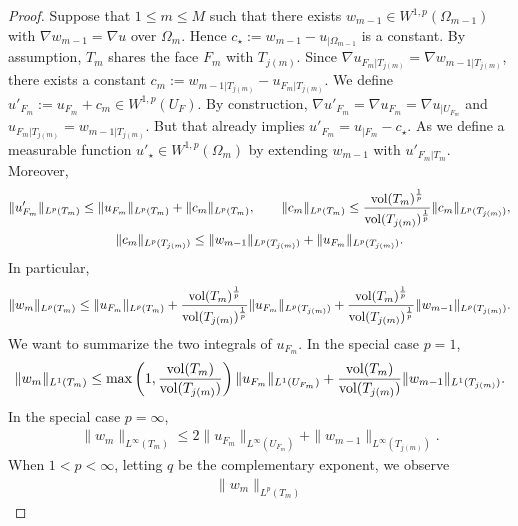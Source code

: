 \documentclass[a4paper]{amsart}
\begin{document}
\begin{proof}
 Suppose that $1 \leq m \leq M$ such that there exists $w_{m-1} \in W^{1,p}(\Omega_{m-1})$ with $\nabla w_{m-1} = \nabla u$ over $\Omega_m$. Hence $c_{\star} := w_{m-1} - u_{|\Omega_{m-1}}$ is a constant. 
 By assumption, $T_{m}$ shares the face $F_{m}$ with $T_{j(m)}$. 
 Since $\nabla u_{F_{m}|T_{j(m)}} = \nabla w_{m-1|T_{j(m)}}$,
 there exists a constant $c_{m} := w_{m-1|T_{j(m)}} - u_{F_{m}|T_{j(m)}}$.
 We define $u'_{F_m} := u_{F_m} + c_{m} \in W^{1,p}(U_F)$.
 By construction, $\nabla u'_{F_m} = \nabla u_{F_m} = \nabla u_{|U_{F_m}}$ and $u_{F_{m}|T_{j(m)}} = w_{m-1|T_{j(m)}}$. 
 But that already implies $u'_{F_m} = u_{|F_m} - c_{\star}$. 
 As we define a measurable function $u'_{\star} \in W^{1,p}(\Omega_m)$ by extending $w_{m-1}$ with $u'_{F_m|T_m}$.
 Moreover, 
 \begin{gather*}
    \| u'_{F_m} \|_{L^{p}(T_m)}
    \leq 
    \| u_{F_m} \|_{L^{p}(T_m)}
    +
    \| c_{m} \|_{L^{p}(T_m)},
    \qquad 
    \| c_{m} \|_{L^{p}(T_m)}
    \leq 
    \frac{ \operatorname{vol}(T_m)^{\frac 1 p} }{ \operatorname{vol}(T_{j(m)})^{\frac 1 p} }
    \| c_{m} \|_{L^{p}(T_{j(m)})},
    \\ 
    \| c_{m} \|_{L^{p}(T_{j(m)})}
    \leq 
    \| w_{m-1}\|_{L^{p}(T_{j(m)})} + \| u_{F_{m}} \|_{L^{p}(T_{j(m)})} 
    .
 \end{gather*}
 In particular,
 \begin{align*}
    \| w_{m} \|_{L^{p}(T_m)}
    \leq 
    \| u_{F_m} \|_{L^{p}(T_m)}
    +
    \frac{ \operatorname{vol}(T_m)^{\frac 1 p} }{ \operatorname{vol}(T_{j(m)})^{\frac 1 p} }
    \| u_{F_{m}} \|_{L^{p}(T_{j(m)})}
    +
    \frac{ \operatorname{vol}(T_m)^{\frac 1 p} }{ \operatorname{vol}(T_{j(m)})^{\frac 1 p} }
    \| w_{m-1}\|_{L^{p}(T_{j(m)})}
    .
 \end{align*}
 We want to summarize the two integrals of $u_{F_m}$. 
 In the special case $p=1$,
 \begin{align*}
    \| w_{m} \|_{L^{1}(T_m)}
    \leq 
    \max\left(
        1, \frac{ \operatorname{vol}(T_m) }{ \operatorname{vol}(T_{j(m)}) } 
    \right)
    \| u_{F_m} \|_{L^{1}(U_{F_m})}
    +
    \frac{ \operatorname{vol}(T_m) }{ \operatorname{vol}(T_{j(m)}) }
    \| w_{m-1}\|_{L^{1}(T_{j(m)})}
    .
 \end{align*}
 In the special case $p=\infty$, 
 \begin{align*}
    \| w_{m} \|_{L^{\infty}(T_m)}
    \leq 
    2
    \| u_{F_m} \|_{L^{\infty}(U_{F_m})}
    +
    \| w_{m-1}\|_{L^{\infty}(T_{j(m)})}
    .
 \end{align*}
 When $1 < p < \infty$, letting $q$ be the complementary exponent, we observe 
 \begin{align*}
    \| w_{m} \|_{L^{p}(T_m)}

\end{align*}
\end{proof}
\end{document}
